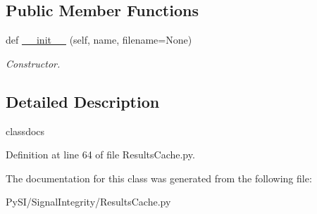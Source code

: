 \subsection*{Public Member Functions}
\begin{DoxyCompactItemize}
\item 
\mbox{\label{classSignalIntegrity_1_1ResultsCache_1_1LinesCache_a19e3e370f701435403ddb078f27f1ecb}} 
def \hyperlink{classSignalIntegrity_1_1ResultsCache_1_1LinesCache_a19e3e370f701435403ddb078f27f1ecb}{\+\_\+\+\_\+init\+\_\+\+\_\+} (self, name, filename=None)
\begin{DoxyCompactList}\small\item\em Constructor. \end{DoxyCompactList}\end{DoxyCompactItemize}


\subsection{Detailed Description}
classdocs 

Definition at line 64 of file Results\+Cache.\+py.



The documentation for this class was generated from the following file\+:\begin{DoxyCompactItemize}
\item 
Py\+S\+I/\+Signal\+Integrity/Results\+Cache.\+py\end{DoxyCompactItemize}
